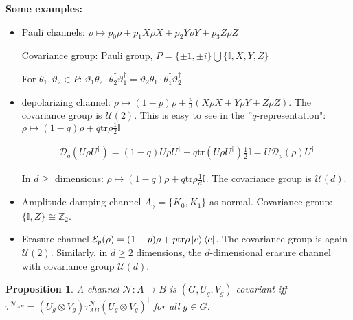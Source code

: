 \documentclass[10pt,oneside,longbibliography]{report}
\newtheorem{proposition}{Proposition}[section]
\begin{document}
\noindent \textbf{Some examples:}
\begin{itemize}
    \item Pauli channels: $\rho \mapsto p_0 \rho + p_1 X\rho X + p_2 Y\rho Y+p_3 Z \rho Z$
    
    Covariance group: Pauli group, $P=\{\pm 1, \pm i\} \bigcup \{\mathbb{I},X,Y,Z\}$
    
    For $\theta_1,\vartheta_2 \in P$: $\vartheta_1 \theta_2 \cdot \theta_2^{\dagger} \vartheta_1^{\dagger} =\vartheta_2 \theta_1 \cdot \theta_1^{\dagger} \vartheta_2^{\dagger}$ 
    
    \item depolarizing channel: $\rho \mapsto (1-p)\rho + \frac{p}{3} (X\rho X + Y\rho Y + Z \rho Z)$. The covariance group is $\mathcal{U}(2)$. This is easy to see in the ''$q$-representation": $\rho \mapsto (1-q)\rho + q \text{tr}\rho \frac{1}{2} \mathbb{I}$
    
    \begin{align}
        \mathcal{D}_q(U \rho U^{\dagger}) = (1-q) U\rho U^{\dagger} + q \text{tr}(U\rho U^{\dagger}) \frac{1}{2}\mathbb{I} = U \mathcal{D}_p (\rho) U^{\dagger}
    \end{align}
    
    In $d\geq$ dimensions: $\rho \mapsto (1-q) \rho + q \text{tr}\rho \frac{1}{d} \mathbb{I}$. The covariance group is $\mathcal{U}(d)$. 
    
    \item Amplitude damping channel $A_{\gamma} = \{K_0, K_1\}$ as normal. Covariance group: $\{\mathbb{I},Z\} \cong \mathbb{Z}_2$.
    
    \item Erasure channel $\mathcal{E}_p (\rho) = (1-p)\rho + p \text{tr}\rho \ket{e}\bra{e}$. The covariance group is again $\mathcal{U}(2)$. Similarly, in $d\geq 2$ dimensions, the $d$-dimensional erasure channel with covariance group $\mathcal{U}(d)$.
\end{itemize}

\begin{proposition}
A channel $\mathcal{N}: A \rightarrow B$ is $(G,U_g,V_g)$-covariant iff $\tau^{\mathcal{N}_{AB}}=(\bar{U}_g \otimes V_g) \tau^{\mathcal{N}}_{AB} (\bar{U}_g \otimes V_g)^{\dagger}$ for all $g \in G$.
\end{proposition}
\end{document}

